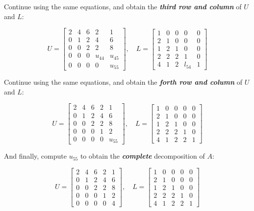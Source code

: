 \documentclass[a4paper,titlepage]{article}
\begin{document}
			Continue using the same equations, and obtain the \textbf{\textit{third row and column}} of $U$ and $L$:
			
			$$
				U = \begin{bmatrix}
					2 & 4 & 6 & 2 & 1\\
					0 & 1 & 2 & 4 & 6\\
					0 & 0 & 2 & 2 & 8\\
					0 & 0 & 0 & u_{44} & u_{45}\\
					0 & 0 & 0 & 0 & u_{55}
				\end{bmatrix}, \quad
				L = \begin{bmatrix}
					1 & 0 & 0 & 0 & 0\\
					2 & 1 & 0 & 0 & 0\\
					1 & 2 & 1 & 0 & 0\\
					2 & 2 & 2 & 1 & 0\\
					4 & 1 & 2 & l_{54} & 1
				\end{bmatrix}
			$$
			
			Continue using the same equations, and obtain the \textbf{\textit{forth row and column}} of $U$ and $L$:
			
			$$
			U = \begin{bmatrix}
			2 & 4 & 6 & 2 & 1\\
			0 & 1 & 2 & 4 & 6\\
			0 & 0 & 2 & 2 & 8\\
			0 & 0 & 0 & 1 & 2\\
			0 & 0 & 0 & 0 & u_{55}
			\end{bmatrix}, \quad
			L = \begin{bmatrix}
			1 & 0 & 0 & 0 & 0\\
			2 & 1 & 0 & 0 & 0\\
			1 & 2 & 1 & 0 & 0\\
			2 & 2 & 2 & 1 & 0\\
			4 & 1 & 2 & 2 & 1
			\end{bmatrix}
			$$
			
			And finally, compute $u_{55}$ to obtain the \textbf{\textit{complete}} decomposition of $A$:
			
			$$
			U = \begin{bmatrix}
			2 & 4 & 6 & 2 & 1\\
			0 & 1 & 2 & 4 & 6\\
			0 & 0 & 2 & 2 & 8\\
			0 & 0 & 0 & 1 & 2\\
			0 & 0 & 0 & 0 & 4
			\end{bmatrix}, \quad
			L = \begin{bmatrix}
			1 & 0 & 0 & 0 & 0\\
			2 & 1 & 0 & 0 & 0\\
			1 & 2 & 1 & 0 & 0\\
			2 & 2 & 2 & 1 & 0\\
			4 & 1 & 2 & 2 & 1
			\end{bmatrix}
			$$
			
\end{document}
